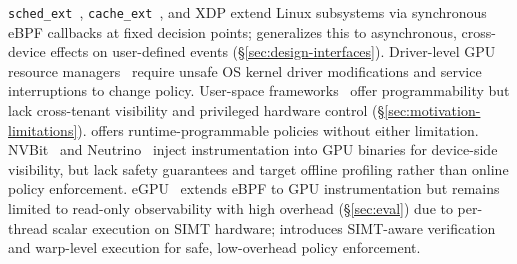 \texttt{sched\_ext}~\cite{schedext-docs}, \texttt{cache\_ext}~\cite{zussman2025cache_ext}, and XDP extend Linux subsystems via synchronous eBPF callbacks at fixed decision points;
\sys generalizes this to asynchronous, cross-device effects on user-defined events (\S\ref{sec:design-interfaces}).
Driver-level GPU resource managers~\cite{kato2011timegraph,kato2012gdev,kernelintercept,fan2025gpreempt,wang2024gcaps,coppock2025lithos} require unsafe OS kernel driver modifications and service interruptions to change policy.
User-space frameworks~\cite{ng2023paella,shen2025xsched,gim2025pie,chen2025ktransformers} offer programmability but lack cross-tenant visibility and privileged hardware control (\S\ref{sec:motivation-limitations}).
\sys offers runtime-programmable policies without either limitation.
NVBit~\cite{villa2019nvbit} and Neutrino~\cite{neutrino} inject instrumentation into GPU binaries for device-side visibility, but lack safety guarantees and target offline profiling rather than online policy enforcement.
eGPU~\cite{egpu} extends eBPF to GPU instrumentation but remains limited to read-only observability with high overhead (\S\ref{sec:eval}) due to per-thread scalar execution on SIMT hardware;
\sys introduces SIMT-aware verification and warp-level execution for safe, low-overhead policy enforcement.
